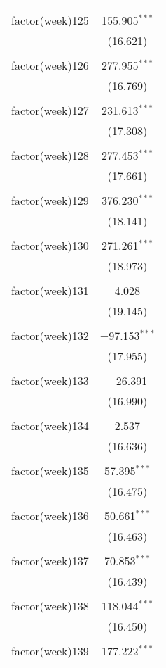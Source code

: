\documentclass[twoside,twocolumn]{article}
\begin{document}
\begin{table}[!htbp]
\begin{tabular}{@{\extracolsep{5pt}}lc}
  & \\ 
 factor(week)125 & 155.905$^{***}$ \\ 
  & (16.621) \\ 
  & \\ 
 factor(week)126 & 277.955$^{***}$ \\ 
  & (16.769) \\ 
  & \\ 
 factor(week)127 & 231.613$^{***}$ \\ 
  & (17.308) \\ 
  & \\ 
 factor(week)128 & 277.453$^{***}$ \\ 
  & (17.661) \\ 
  & \\ 
 factor(week)129 & 376.230$^{***}$ \\ 
  & (18.141) \\ 
  & \\ 
 factor(week)130 & 271.261$^{***}$ \\ 
  & (18.973) \\ 
  & \\ 
 factor(week)131 & 4.028 \\ 
  & (19.145) \\ 
  & \\ 
 factor(week)132 & $-$97.153$^{***}$ \\ 
  & (17.955) \\ 
  & \\ 
 factor(week)133 & $-$26.391 \\ 
  & (16.990) \\ 
  & \\ 
 factor(week)134 & 2.537 \\ 
  & (16.636) \\ 
  & \\ 
 factor(week)135 & 57.395$^{***}$ \\ 
  & (16.475) \\ 
  & \\ 
 factor(week)136 & 50.661$^{***}$ \\ 
  & (16.463) \\ 
  & \\ 
 factor(week)137 & 70.853$^{***}$ \\ 
  & (16.439) \\ 
  & \\ 
 factor(week)138 & 118.044$^{***}$ \\ 
  & (16.450) \\ 
  & \\ 
 factor(week)139 & 177.222$^{***}$ \\ 

\end{tabular}
\end{table}
\end{document}
